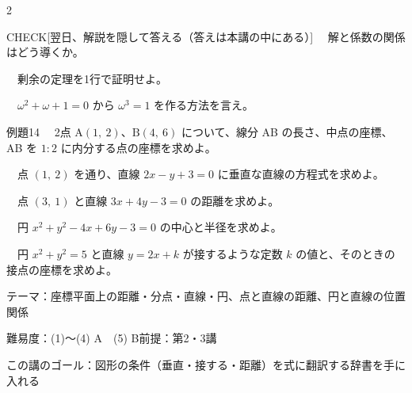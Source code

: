 \documentclass[paper=b5j, fontsize=8pt, fleqn, twoside]{jlreq}
\begin{document}
\begin{multicols*}{2}
  \begin{ptbs}{CHECK}[翌日、解説を隠して答える（答えは本講の中にある）]
    　解と係数の関係はどう導くか。\par
    　剰余の定理を1行で証明せよ。\par
    　$\omega^2+\omega+1=0$ から $\omega^3=1$ を作る方法を言え。
  \end{ptbs}

  \notefill
\end{multicols*}

\begin{ascolorbox4A}[出典：オリジナル]{例題14}
  　2点 $\mathrm A(1,\ 2)$、$\mathrm B(4,\ 6)$ について、線分 AB の長さ、中点の座標、AB を $1:2$ に内分する点の座標を求めよ。\par
  　点 $(1,\ 2)$ を通り、直線 $2x-y+3=0$ に垂直な直線の方程式を求めよ。\par
  　点 $(3,\ 1)$ と直線 $3x+4y-3=0$ の距離を求めよ。\par
  　円 $x^2+y^2-4x+6y-3=0$ の中心と半径を求めよ。\par
  　円 $x^2+y^2=5$ と直線 $y=2x+k$ が接するような定数 $k$ の値と、そのときの接点の座標を求めよ。
\end{ascolorbox4A}

\begin{Data}
  テーマ：座標平面上の距離・分点・直線・円、点と直線の距離、円と直線の位置関係\par
  難易度：(1)〜(4) A　(5) B\quad 前提：第2・3講\par
  この講のゴール：図形の条件（垂直・接する・距離）を式に翻訳する辞書を手に入れる
\end{Data}
\end{document}
